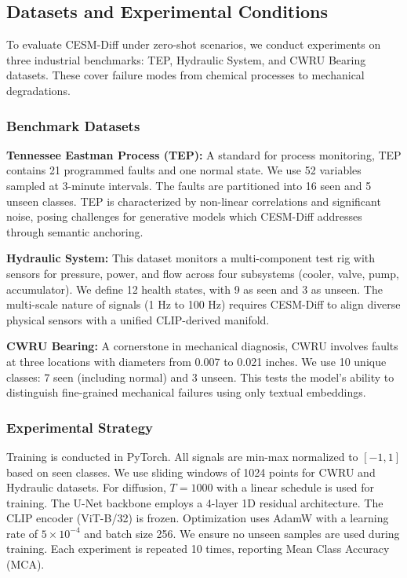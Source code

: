 \subsection{Datasets and Experimental Conditions}
\label{sec:datasets}

To evaluate CESM-Diff under zero-shot scenarios, we conduct experiments on three industrial benchmarks: TEP, Hydraulic System, and CWRU Bearing datasets. These cover failure modes from chemical processes to mechanical degradations.

\subsubsection{Benchmark Datasets}
\textbf{Tennessee Eastman Process (TEP):} A standard for process monitoring, TEP contains 21 programmed faults and one normal state. We use 52 variables sampled at 3-minute intervals. The faults are partitioned into 16 seen and 5 unseen classes. TEP is characterized by non-linear correlations and significant noise, posing challenges for generative models which CESM-Diff addresses through semantic anchoring.

\textbf{Hydraulic System:} This dataset monitors a multi-component test rig with sensors for pressure, power, and flow across four subsystems (cooler, valve, pump, accumulator). We define 12 health states, with 9 as seen and 3 as unseen. The multi-scale nature of signals (1 Hz to 100 Hz) requires CESM-Diff to align diverse physical sensors with a unified CLIP-derived manifold.

\textbf{CWRU Bearing:} A cornerstone in mechanical diagnosis, CWRU involves faults at three locations with diameters from 0.007 to 0.021 inches. We use 10 unique classes: 7 seen (including normal) and 3 unseen. This tests the model's ability to distinguish fine-grained mechanical failures using only textual embeddings.

\subsubsection{Experimental Strategy}
Training is conducted in PyTorch. All signals are min-max normalized to $[-1, 1]$ based on seen classes. We use sliding windows of 1024 points for CWRU and Hydraulic datasets. For diffusion, $T=1000$ with a linear schedule is used for training. The U-Net backbone employs a 4-layer 1D residual architecture. The CLIP encoder (ViT-B/32) is frozen. Optimization uses AdamW with a learning rate of $5 \times 10^{-4}$ and batch size 256. We ensure no unseen samples are used during training. Each experiment is repeated 10 times, reporting Mean Class Accuracy (MCA).
